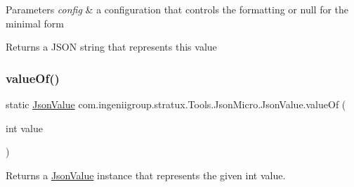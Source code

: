 \begin{DoxyParams}{Parameters}
{\em config} & a configuration that controls the formatting or {\ttfamily null} for the minimal form \\
\hline
\end{DoxyParams}
\begin{DoxyReturn}{Returns}
a J\+S\+ON string that represents this value 
\end{DoxyReturn}
\mbox{\label{classcom_1_1ingeniigroup_1_1stratux_1_1_tools_1_1_json_micro_1_1_json_value_a1a750fe77d81a8c1d4544cdb2c34297c}} 
\subsubsection{\texorpdfstring{value\+Of()}{valueOf()}\hspace{0.1cm}{\footnotesize\ttfamily [1/6]}}
{\footnotesize\ttfamily static \hyperlink{classcom_1_1ingeniigroup_1_1stratux_1_1_tools_1_1_json_micro_1_1_json_value}{Json\+Value} com.\+ingeniigroup.\+stratux.\+Tools.\+Json\+Micro.\+Json\+Value.\+value\+Of (\begin{DoxyParamCaption}\item[{int}]{value }\end{DoxyParamCaption})\hspace{0.3cm}{\ttfamily [static]}}

Returns a \hyperlink{classcom_1_1ingeniigroup_1_1stratux_1_1_tools_1_1_json_micro_1_1_json_value}{Json\+Value} instance that represents the given {\ttfamily int} value.


